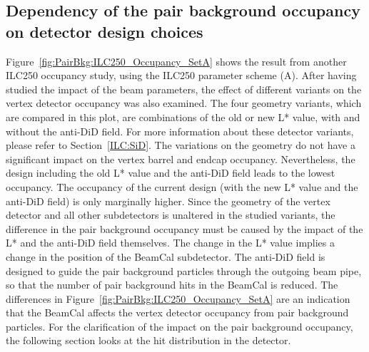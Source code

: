 \subsection{Dependency of the pair background occupancy on detector design choices}
Figure~\ref{fig:PairBkg:ILC250_Occupancy_SetA} shows the result from another ILC250 occupancy study, using the ILC250 parameter scheme (A).
After having studied the impact of the beam parameters, the effect of different \sid variants on the vertex detector occupancy was also examined.
The four geometry variants, which are compared in this plot, are combinations of the old or new L* value, with and without the \sid anti-DiD field.
For more information about these detector variants, please refer to Section~\ref{ILC:SiD}.
The variations on the \sid geometry do not have a significant impact on the vertex barrel and endcap occupancy. 
Nevertheless, the \sid design including the old L* value and the anti-DiD field leads to the lowest occupancy.
The occupancy of the current design (with the new L* value and the anti-DiD field) is only marginally higher.
Since the geometry of the vertex detector and all other subdetectors is unaltered in the studied \sid variants, the difference in the pair background occupancy must be caused by the impact of the L* and the anti-DiD field themselves.
The change in the L* value implies a change in the position of the BeamCal subdetector.
The anti-DiD field is designed to guide the pair background particles through the outgoing beam pipe, so that the number of pair background hits in the BeamCal is reduced.
The differences in Figure~\ref{fig:PairBkg:ILC250_Occupancy_SetA} are an indication that the \sid BeamCal affects the vertex detector occupancy from pair background particles.
For the clarification of the impact on the pair background occupancy, the following section looks at the hit distribution in the \sid detector.
